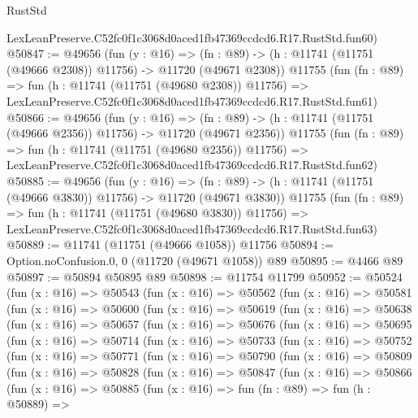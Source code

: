 \begin{lexlean}{RustStd}
\begin{coremodule}
    LexLeanPreserve.C52fc0f1c3068d0aced1fb47369ccdcd6.R17.RustStd.fun60)
@50847 := @49656
    (fun (y : @16) =>
    (fn : @89) -> (h : @11741 (@11751 (@49666 @2308)) @11756) -> @11720 (@49671 @2308))
    @11755
    (fun (fn : @89) =>
    fun (h : @11741 (@11751 (@49680 @2308)) @11756) =>
    LexLeanPreserve.C52fc0f1c3068d0aced1fb47369ccdcd6.R17.RustStd.fun61)
@50866 := @49656
    (fun (y : @16) =>
    (fn : @89) -> (h : @11741 (@11751 (@49666 @2356)) @11756) -> @11720 (@49671 @2356))
    @11755
    (fun (fn : @89) =>
    fun (h : @11741 (@11751 (@49680 @2356)) @11756) =>
    LexLeanPreserve.C52fc0f1c3068d0aced1fb47369ccdcd6.R17.RustStd.fun62)
@50885 := @49656
    (fun (y : @16) =>
    (fn : @89) -> (h : @11741 (@11751 (@49666 @3830)) @11756) -> @11720 (@49671 @3830))
    @11755
    (fun (fn : @89) =>
    fun (h : @11741 (@11751 (@49680 @3830)) @11756) =>
    LexLeanPreserve.C52fc0f1c3068d0aced1fb47369ccdcd6.R17.RustStd.fun63)
@50889 := @11741 (@11751 (@49666 @1058)) @11756
@50894 := Option.noConfusion.{0, 0} (@11720 (@49671 @1058)) @89
@50895 := @4466 @89
@50897 := @50894 @50895 @89
@50898 := @11754 @11799
@50952 := @50524
    (fun (x : @16) =>
    @50543
      (fun (x : @16) =>
      @50562
        (fun (x : @16) =>
        @50581
          (fun (x : @16) =>
          @50600
            (fun (x : @16) =>
            @50619
              (fun (x : @16) =>
              @50638
                (fun (x : @16) =>
                @50657
                  (fun (x : @16) =>
                  @50676
                    (fun (x : @16) =>
                    @50695
                      (fun (x : @16) =>
                      @50714
                        (fun (x : @16) =>
                        @50733
                          (fun (x : @16) =>
                          @50752
                            (fun (x : @16) =>
                            @50771
                              (fun (x : @16) =>
                              @50790
                                (fun (x : @16) =>
                                @50809
                                  (fun (x : @16) =>
                                  @50828
                                    (fun (x : @16) =>
                                    @50847
                                      (fun (x : @16) =>
                                      @50866
                                        (fun (x : @16) =>
                                        @50885
                                          (fun (x : @16) =>
                                          fun (fn : @89) =>
                                          fun (h : @50889) =>

\end{coremodule}
\end{lexlean}
